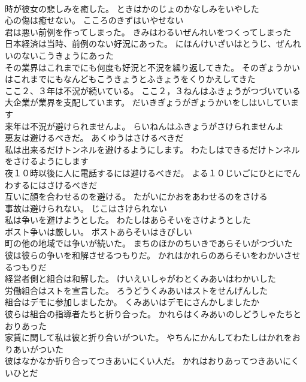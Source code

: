 \documentclass[8pt]{extreport}
\begin{document}
\begin{CJK}{UTF8}{min}
\\	時が彼女の悲しみを癒した。	ときはかのじょのかなしみをいやした 
\\	心の傷は癒せない。	こころのきずはいやせない 
\\	君は悪い前例を作ってしまった。	きみはわるいぜんれいをつくってしまった 
\\	日本経済は当時、前例のない好況にあった。	にほんけいざいはとうじ、ぜんれいのないこうきょうにあった 
\\	その業界はこれまでにも何度も好況と不況を繰り返してきた。	そのぎょうかいはこれまでにもなんどもこうきょうとふきょうをくりかえしてきた 
\\	ここ２、３年は不況が続いている。	ここ２，３ねんはふきょうがつづいている 
\\	大企業が業界を支配しています。	だいきぎょうがぎょうかいをしはいしています 
\\	来年は不況が避けられませんよ。	らいねんはふきょうがさけられませんよ 
\\	悪友は避けるべきだ。	あくゆうはさけるべきだ 
\\	私は出来るだけトンネルを避けるようにします。	わたしはできるだけトンネルをさけるようにします 
\\	夜１０時以後に人に電話するには避けるべきだ。	よる１０じいごにひとにでんわするにはさけるべきだ 
\\	互いに顔を合わせるのを避ける。	たがいにかおをあわせるのをさける 
\\	事故は避けられない。	じこはさけられない 
\\	私は争いを避けようとした。	わたしはあらそいをさけようとした 
\\	ポスト争いは厳しい。	ポストあらそいはきびしい 
\\	町の他の地域では争いが続いた。	まちのほかのちいきであらそいがつづいた 
\\	彼は彼らの争いを和解させるつもりだ。	かれはかれらのあらそいをわかいさせるつもりだ 
\\	経営者側と組合は和解した。	けいえいしゃがわとくみあいはわかいした 
\\	労働組合はストを宣言した。	ろうどうくみあいはストをせんげんした 
\\	組合はデモに参加しましたか。	くみあいはデモにさんかしましたか 
\\	彼らは組合の指導者たちと折り合った。	かれらはくみあいのしどうしゃたちとおりあった 
\\	家賃に関して私は彼と折り合いがついた。	やちんにかんしてわたしはかれをおりあいがついた 
\\	彼はなかなか折り合ってつきあいにくい人だ。	かれはおりあってつきあいにくいひとだ 

\end{CJK}
\end{document}
